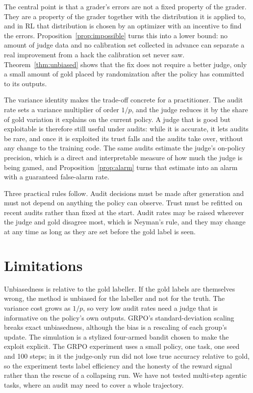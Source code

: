 The central point is that a grader's errors are not a fixed property of the grader. They are a property of the grader together with the distribution it is applied to, and in RL that distribution is chosen by an optimizer with an incentive to find the errors. Proposition~\ref{prop:impossible} turns this into a lower bound: no amount of judge data and no calibration set collected in advance can separate a real improvement from a hack the calibration set never saw. Theorem~\ref{thm:unbiased} shows that the fix does not require a better judge, only a small amount of gold placed by randomization after the policy has committed to its outputs.

The variance identity makes the trade-off concrete for a practitioner. The audit rate sets a variance multiplier of order $1/p$, and the judge reduces it by the share of gold variation it explains on the current policy. A judge that is good but exploitable is therefore still useful under audits: while it is accurate, it lets audits be rare, and once it is exploited its trust falls and the audits take over, without any change to the training code. The same audits estimate the judge's on-policy precision, which is a direct and interpretable measure of how much the judge is being gamed, and Proposition~\ref{prop:alarm} turns that estimate into an alarm with a guaranteed false-alarm rate.

Three practical rules follow. Audit decisions must be made after generation and must not depend on anything the policy can observe. Trust must be refitted on recent audits rather than fixed at the start. Audit rates may be raised wherever the judge and gold disagree most, which is Neyman's rule, and they may change at any time as long as they are set before the gold label is seen.

\section{Limitations}
\label{sec:limitations}

Unbiasedness is relative to the gold labeller. If the gold labels are themselves wrong, the method is unbiased for the labeller and not for the truth. The variance cost grows as $1/p$, so very low audit rates need a judge that is informative on the policy's own outputs. GRPO's standard-deviation scaling breaks exact unbiasedness, although the bias is a rescaling of each group's update. The simulation is a stylized four-armed bandit chosen to make the exploit explicit. The GRPO experiment uses a small policy, one task, one seed and 100 steps; in it the judge-only run did not lose true accuracy relative to gold, so the experiment tests label efficiency and the honesty of the reward signal rather than the rescue of a collapsing run. We have not tested multi-step agentic tasks, where an audit may need to cover a whole trajectory.

